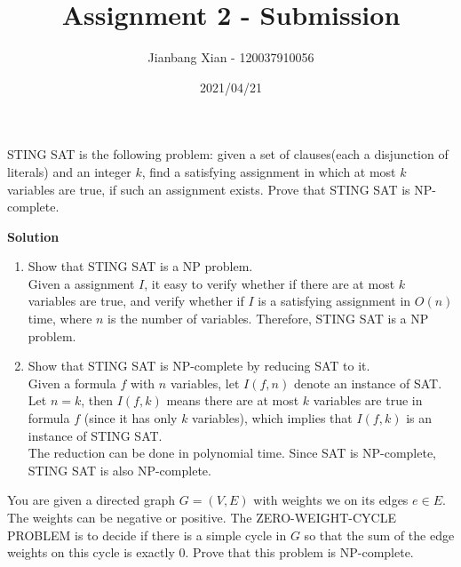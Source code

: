 \documentclass{article}
\title{{\bf Assignment 2 - Submission}}
\author{Jianbang Xian - 120037910056}
\date{2021/04/21}
\newcounter{exercise}
\newcommand{\<}{
    \langle}
\renewcommand{\>}{
    \rangle}
\begin{document}
\maketitle


{\large





\begin{exercise}
\textsf{STING SAT} is the following problem: given a set of clauses(each a disjunction of literals) and an integer $k$, find a satisfying assignment in which at most
$k$ variables are true, if such an assignment exists. Prove that \textsf{STING SAT} is NP-complete.
\end{exercise}

\bigskip \noindent
\textbf{Solution}
\begin{enumerate}[label=\arabic*)]
    \item Show that \textsf{STING SAT} is a NP problem. \\
    Given a assignment $I$, it easy to verify whether if there are at most $k$ variables are true, and verify whether if $I$ is a satisfying assignment in $O(n)$ time, where $n$ is the number of variables. Therefore, \textsf{STING SAT} is a NP problem.
    \item Show that \textsf{STING SAT} is NP-complete by reducing \textsf{SAT} to it. \\
    Given a formula $f$ with $n$ variables, let $I(f,n)$ denote an instance of \textsf{SAT}. Let $n=k$, then $I(f,k)$ means there are at most $k$ variables are true in formula $f$ (since it has only $k$ variables), which implies that $I(f,k)$ is an instance of \textsf{STING SAT}. \\
    The reduction can be done in polynomial time. Since \textsf{SAT} is NP-complete, \textsf{STING SAT} is also NP-complete.
\end{enumerate}

\begin{exercise}
You are given a directed graph $G=(V,E)$ with weights we on its edges $e\in E$. The weights can be negative or positive. The \textsf{ZERO-WEIGHT-CYCLE PROBLEM} is to decide if there is a simple cycle in $G$ so that the sum of the edge weights on this cycle is exactly $0$. Prove that this problem is NP-complete.
\end{exercise}

}
\end{document}

